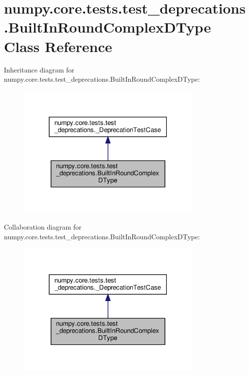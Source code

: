 \hypertarget{classnumpy_1_1core_1_1tests_1_1test__deprecations_1_1BuiltInRoundComplexDType}{}\section{numpy.\+core.\+tests.\+test\+\_\+deprecations.\+Built\+In\+Round\+Complex\+D\+Type Class Reference}
\label{classnumpy_1_1core_1_1tests_1_1test__deprecations_1_1BuiltInRoundComplexDType}


Inheritance diagram for numpy.\+core.\+tests.\+test\+\_\+deprecations.\+Built\+In\+Round\+Complex\+D\+Type\+:
\nopagebreak
\begin{figure}[H]
\begin{center}
\leavevmode
\includegraphics[width=261pt]{classnumpy_1_1core_1_1tests_1_1test__deprecations_1_1BuiltInRoundComplexDType__inherit__graph}
\end{center}
\end{figure}


Collaboration diagram for numpy.\+core.\+tests.\+test\+\_\+deprecations.\+Built\+In\+Round\+Complex\+D\+Type\+:
\nopagebreak
\begin{figure}[H]
\begin{center}
\leavevmode
\includegraphics[width=261pt]{classnumpy_1_1core_1_1tests_1_1test__deprecations_1_1BuiltInRoundComplexDType__coll__graph}
\end{center}
\end{figure}
